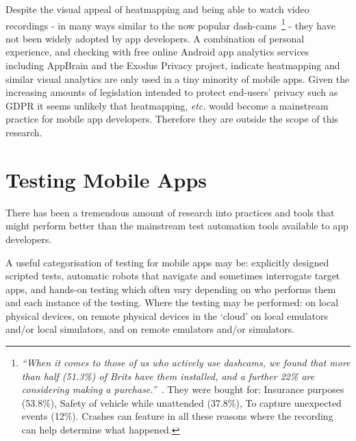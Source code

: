Despite the visual appeal of heatmapping and being able to watch video recordings - in many ways similar to the now popular dash-cams~\footnote{\emph{``When it comes to those of us who actively use dashcams, we found that more than half (51.3\%) of Brits have them installed, and a further 22\% are considering making a purchase.''}~\textcite{vardy2018_a_survey_of_dashcams_in_uk_cars}. They were bought for: Insurance purposes (53.8\%), Safety of vehicle while unattended (37.8\%), To capture unexpected events (12\%). Crashes can feature in all these reasons where the recording can help determine what happened.} - they have not been widely adopted by app developers. A combination of personal experience, and checking with free online Android app analytics services including AppBrain and the Exodus Privacy project, indicate heatmapping and similar visual analytics are only used in a tiny minority of mobile apps. Given the increasing amounts of legislation intended to protect end-users' privacy such as GDPR it seems unlikely that heatmapping, \textit{etc.} would become a mainstream practice for mobile app developers. Therefore they are outside the scope of this research.




\hypertarget{mobile.testing}{}
\section{Testing Mobile Apps}

There has been a tremendous amount of research into practices and tools that might perform better than the mainstream test automation tools available to app developers.

A useful categorisation of testing for mobile apps may be: 
explicitly designed scripted tests, 
automatic robots that navigate and sometimes interrogate target apps, and 
hands-on testing which often vary depending on who performs them and each instance of the testing. 
Where the testing may be performed:
on local physical devices,
on remote physical devices in the `cloud'
on local emulators and/or local simulators, and
on remote emulators and/or simulators.



